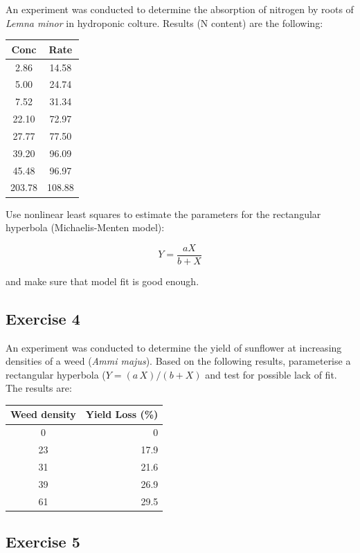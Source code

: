 \documentclass[a4paper,12pt,oneside]{book}
\begin{document}
An experiment was conducted to determine the absorption of nitrogen by roots of \emph{Lemna minor} in hydroponic colture. Results (N content) are the following:

\begin{longtable}[]{@{}cc@{}}
\toprule
Conc & Rate \\
\midrule
\endhead
2.86 & 14.58 \\
5.00 & 24.74 \\
7.52 & 31.34 \\
22.10 & 72.97 \\
27.77 & 77.50 \\
39.20 & 96.09 \\
45.48 & 96.97 \\
203.78 & 108.88 \\
\bottomrule
\end{longtable}

Use nonlinear least squares to estimate the parameters for the rectangular hyperbola (Michaelis-Menten model):

\[Y = \frac{a X} {b + X}\]

and make sure that model fit is good enough.

\hypertarget{exercise-4-5}{%
\subsection{Exercise 4}\label{exercise-4-5}}

An experiment was conducted to determine the yield of sunflower at increasing densities of a weed (\emph{Ammi majus}). Based on the following results, parameterise a rectangular hyperbola (\(Y = (a \, X)/(b + X)\) and test for possible lack of fit. The results are:

\begin{longtable}[]{@{}cr@{}}
\toprule
Weed density & Yield Loss (\%) \\
\midrule
\endhead
0 & 0 \\
23 & 17.9 \\
31 & 21.6 \\
39 & 26.9 \\
61 & 29.5 \\
\bottomrule
\end{longtable}

\hypertarget{exercise-5-3}{%
\subsection{Exercise 5}\label{exercise-5-3}}
\end{document}
